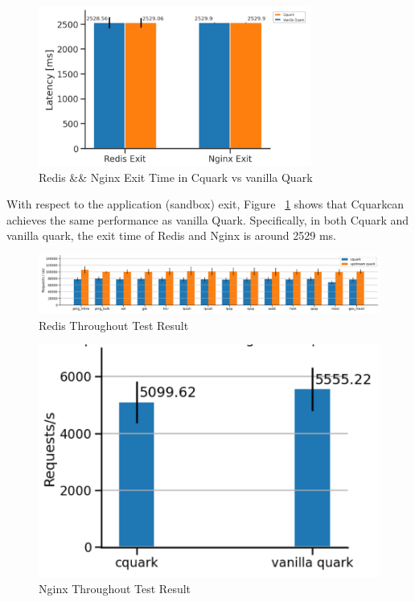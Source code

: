 \begin{figure}[H]
    \centering
    \includegraphics[width=0.8\textwidth]{images/reds_nginx_exit_comp.PNG}
    \caption[Redis \&\& Nginx Exit Time in Cquark vs vanilla Quark]{Redis \&\& Nginx Exit Time in Cquark vs vanilla Quark}
    \label{fig:reds_nginx_exit_comp}
\end{figure}


With respect to the application (sandbox) exit, Figure ~\ref{fig:reds_nginx_exit_comp}  shows that Cquarkcan achieves the same performance as vanilla Quark. Specifically, in both Cquark and vanilla quark, the exit time of Redis and Nginx is around 2529 ms.

\begin{figure}[H]
    \centering
    \includegraphics[width=1\textwidth]{images/redis_throughput.PNG}
    \caption[Redis Throughout Test]{Redis Throughout Test Result}
    \label{fig:redis_throughput}
\end{figure}


\begin{figure}[H]
    \centering
    \includegraphics[width=1\textwidth]{images/nginx_throughput.PNG}
    \caption[Nginx Throughout Test]{Nginx Throughout Test Result}
    \label{fig:nginx_throughput}
\end{figure}


